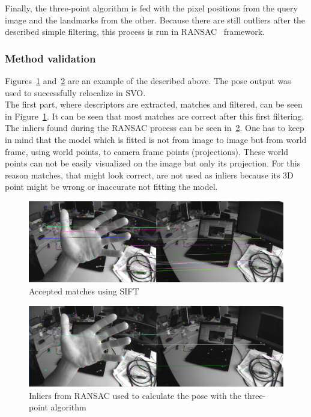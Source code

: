 Finally, the three-point algorithm is fed with the pixel positions from the query image and the landmarks from the other. Because there are still outliers after the described simple filtering, this process is run in RANSAC~\cite{fischler1981random} framework. \\


\subsubsection{Method validation}
\label{ssub:3pt_method_validation}

Figures~\ref{fig:3pt_matches} and~\ref{fig:3pt_inliers} are an example of the described above. The pose output was used to successfully relocalize in SVO.\\

The first part, where descriptors are extracted, matches and filtered, can be seen in Figure~\ref{fig:3pt_matches}.  It can be seen that most matches are correct after this first filtering.\\

The inliers found during the RANSAC process can be seen in~\ref{fig:3pt_inliers}. One has to keep in mind that the model which is fitted  is not from image to image but from world frame, using world points, to camera frame points (projections). These world points can not be  easily visualized on the image but only its projection. For this reason matches, that might look correct, are not used as inliers because its 3D point might be wrong or inaccurate not fitting the model. \\

\begin{figure}[htpb]
  \centering
  \includegraphics[width=1.0\linewidth]{img/3pt_matches_1.png}
  \caption{Accepted matches using SIFT}
  \label{fig:3pt_matches}
\end{figure}


\begin{figure}[htpb]
  \centering
  \includegraphics[width=1.0\linewidth]{img/3pt_inliers_1.png}
  \caption{Inliers from RANSAC used to calculate the pose with the three-point algorithm }
  \label{fig:3pt_inliers}
\end{figure}


